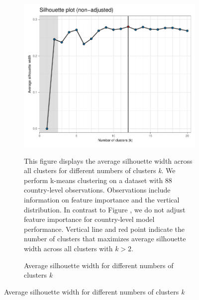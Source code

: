 \begin{figure}[ht!]\ContinuedFloat
   \centering
   \begin{subfigure}[b]{\textwidth}
   \centering
   \caption{Average silhouette width for different numbers of clusters \textit{k}} \label{fig:G1_silhouette}
   \includegraphics{Figures_Appendix/Figure_Silhouette_1.pdf}
   \begin{subcaption2}
     This figure displays the average silhouette width across all clusters for different numbers of clusters \textit{k}. We perform k-means clustering on a dataset with 88 country-level observations. Observations include information on feature importance and the vertical distribution. In contrast to Figure , we do not adjust feature importance for country-level model performance. Vertical line and red point indicate the number of clusters that maximizes average silhouette width across all clusters with $k>2$.
   \end{subcaption2}
   \end{subfigure}
 \end{figure}

 \clearpage

